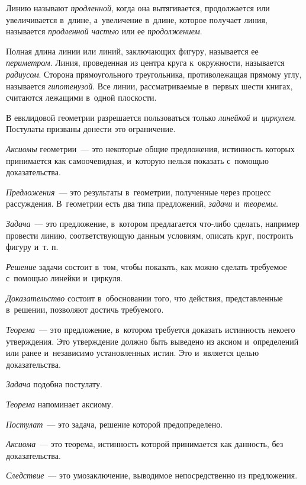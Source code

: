 \documentclass[letters,booklanguage=russian]{byrnebook}
\begin{document}
Линию называют \emph{продленной}, когда она вытягивается, продолжается или увеличивается в~длине, а~увеличение в~длине, которое получает линия, называется \emph{продленной частью} или ее \emph{продолжением}.

Полная длина линии или линий, заключающих фигуру, называется ее \emph{периметром}. %
Линия, проведенная из центра круга к~окружности, называется \emph{радиусом}. Сторона прямоугольного треугольника, противолежащая прямому углу, называется \emph{гипотенузой}. %
Все линии, рассматриваемые в~первых шести книгах, считаются лежащими в~одной плоскости.

В евклидовой геометрии разрешается пользоваться только \emph{линейкой} и~\emph{циркулем}. Постулаты призваны донести это ограничение.

\emph{Аксиомы} геометрии~— это некоторые общие предложения, истинность которых принимается как самоочевидная, и~которую нельзя показать с~помощью доказательства.

\emph{Предложения}~— это результаты в~геометрии, полученные через процесс рассуждения. В~геометрии есть два типа предложений, \emph{задачи} и~\emph{теоремы}.

\emph{Задача}~— это предложение, в~котором предлагается что-либо сделать, например провести линию, соответствующую данным условиям, описать круг, построить фигуру и~т. п.

\emph{Решение} задачи состоит в~том, чтобы показать, как можно сделать требуемое с~помощью линейки и~циркуля.

\emph{Доказательство} состоит в~обосновании того, что действия, представленные в~решении, позволяют достичь требуемого.

\emph{Теорема}~— это предложение, в~котором требуется доказать истинность некоего утверждения. Это утверждение должно быть выведено из аксиом и~определений или ранее и~независимо установленных истин. Это и~является целью доказательства.

\emph{Задача} подобна постулату.

\emph{Теорема} напоминает аксиому.

\emph{Постулат}~— это задача, решение которой предопределено.

\emph{Аксиома}~— это теорема, истинность которой принимается как данность, без доказательства.

\emph{Следствие}~— это умозаключение, выводимое непосредственно из предложения.
\end{document}
